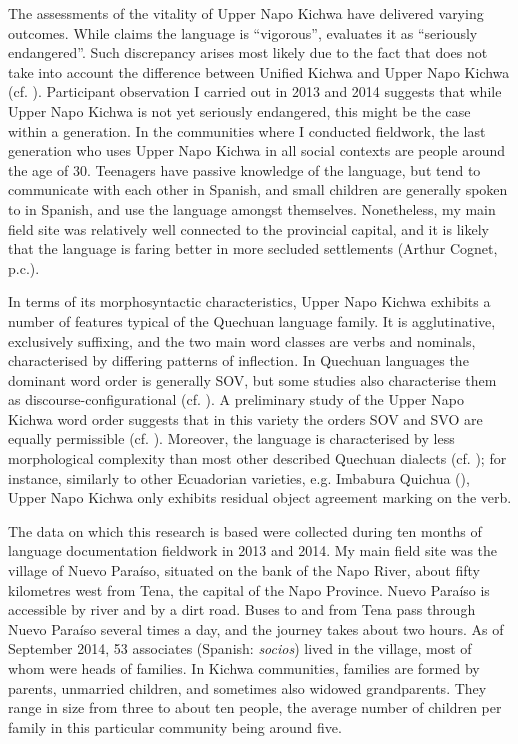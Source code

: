 \documentclass[output=paper]{langscibook}
\begin{document}
The assessments of the vitality of Upper Napo Kichwa have delivered varying outcomes. While \cite{Ethnologue2016} claims the language is “vigorous”, \cite{Moseley2010} evaluates it as “seriously endangered”. Such discrepancy arises most likely due to the fact that \cite{Ethnologue2016} does not take into account the difference between Unified Kichwa and Upper Napo Kichwa (cf. \citealt{Grzech2017}). Participant observation I carried out in 2013 and 2014 suggests that while Upper Napo Kichwa is not yet seriously endangered, this might be the case within a generation. In the communities where I conducted fieldwork, the last generation who uses Upper Napo Kichwa in all social contexts are people around the age of 30. Teenagers have passive knowledge of the language, but tend to communicate with each other in Spanish, and small children are generally spoken to in Spanish, and use the language amongst themselves. Nonetheless, my main field site was relatively well connected to the provincial capital, and it is likely that the language is faring better in more secluded settlements (Arthur Cognet, p.c.).

In terms of its morphosyntactic characteristics, Upper Napo Kichwa exhibits a number of features typical of the Quechuan language family. It is agglutinative, exclusively suffixing, and the two main word classes are verbs and nominals, characterised by differing patterns of inflection. In Quechuan languages the dominant word order is generally SOV, but some studies also characterise them as discourse-configurational (cf. \citealt{Muysken1995}). A preliminary study of the Upper Napo Kichwa word order suggests that in this variety the orders SOV and SVO are equally permissible (cf. \citealt[ch.4]{Grzech2016a}). Moreover, the language is characterised by less morphological complexity than most other described Quechuan dialects (cf. \citealt{Adelaar2004}); for instance, similarly to other Ecuadorian varieties, e.g. Imbabura Quichua (\citealt{Cole1982}), Upper Napo Kichwa only exhibits residual object agreement marking on the verb. 

The data on which this research is based were collected during ten months of language documentation fieldwork in 2013 and 2014. My main field site was the village of Nuevo Paraíso, situated on the bank of the Napo River, about fifty kilometres west from Tena, the capital of the Napo Province. Nuevo Paraíso is accessible by river and by a dirt road. Buses to and from Tena pass through Nuevo Paraíso several times a day, and the journey takes about two hours. As of September 2014, 53 associates (Spanish: \textit{socios}) lived in the village, most of whom were heads of families. In Kichwa communities, families are formed by parents, unmarried children, and sometimes also widowed grandparents. They range in size from three to about ten people, the average number of children per family in this particular community being around five. 
\end{document}
